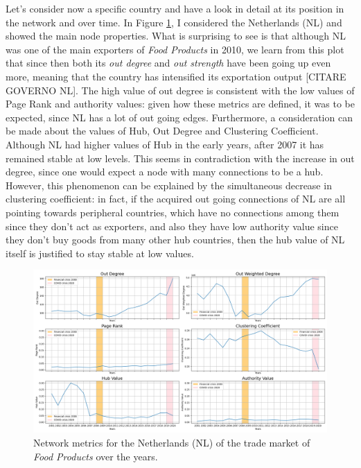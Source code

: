 Let's consider now a specific country and have a look in detail at its position in the network and over time. In Figure \ref{fig:nedmetrics}, I considered the Netherlands (NL) and showed the main node properties. What is surprising to see is that although NL was one of the main exporters of \textit{Food Products} in 2010, we learn from this plot that since then both its \textit{out degree} and \textit{out strength} have been going up even more, meaning that the country has intensified its exportation output [CITARE GOVERNO NL]. The high value of out degree is consistent with the low values of Page Rank and authority values: given how these metrics are defined, it was to be expected, since NL has a lot of out going edges. Furthermore, a consideration can be made about the values of Hub, Out Degree and Clustering Coefficient. Although NL had higher values of Hub in the early years, after 2007 it has remained stable at low levels. This seems in contradiction with the increase in out degree, since one would expect a node with many connections to be a hub. However, this phenomenon can be explained by the simultaneous decrease in clustering coefficient: in fact, if the acquired out going connections of NL are all pointing towards peripheral countries, which have no connections among them since they don't act as exporters, and also they have low authority value since they don't buy goods from many other hub countries, then the hub value of NL itself is justified to stay stable at low values.

\begin{figure}
    \centering
    \includegraphics[width=\textwidth]{pics/NL_p10_metric_ts.png}
    \caption{Network metrics for the Netherlands (NL) of the trade market of \textit{Food Products} over the years.}
    \label{fig:nedmetrics}
\end{figure}

